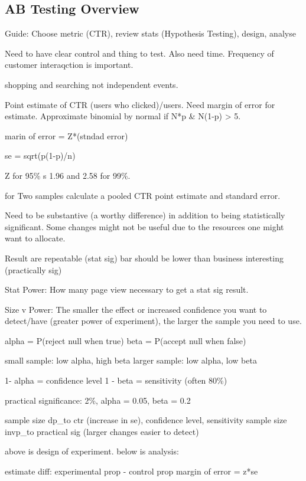 \documentclass[]{book}
\theoremstyle{definition}
\theoremstyle{definition}
\theoremstyle{definition}
\theoremstyle{remark}
\begin{document}
\subsection{AB Testing Overview}\label{ab-testing-overview}

Guide: Choose metric (CTR), review stats (Hypothesis Testing), design,
analyse

Need to have clear control and thing to test. Also need time. Frequency
of customer interaqction is important.

shopping and searching not independent events.

Point estimate of CTR (users who clicked)/users. Need margin of error
for estimate. Approximate binomial by normal if N*p \& N(1-p)
\textgreater{} 5.

marin of error = Z*(stndad error)

se = sqrt(p(1-p)/n)

Z for 95\% s 1.96 and 2.58 for 99\%.

for Two samples calculate a pooled CTR point estimate and standard
error.

Need to be substantive (a worthy difference) in addition to being
statistically significant. Some changes might not be useful due to the
resources one might want to allocate.

Result are repeatable (stat sig) bar should be lower than business
interesting (practically sig)

Stat Power: How many page view necessary to get a stat sig result.

Size v Power: The smaller the effect or increased confidence you want to
detect/have (greater power of experiment), the larger the sample you
need to use.

alpha = P(reject null when true) beta = P(accept null when false)

small sample: low alpha, high beta larger sample: low alpha, low beta

1- alpha = confidence level 1 - beta = sensitivity (often 80\%)

practical significance: 2\%, alpha = 0.05, beta = 0.2

sample size dp\_to ctr (increase in se), confidence level, sensitivity
sample size invp\_to practical sig (larger changes easier to detect)

above is design of experiment. below is analysis:

estimate diff: experimental prop - control prop margin of error = z*se
\end{document}
